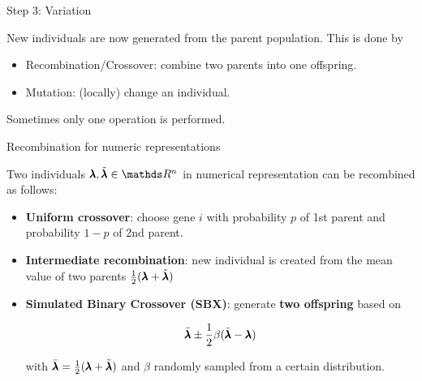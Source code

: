 \begin{frame}{Step 3: Variation}

New individuals are now generated from the parent population. This is done by

\begin{itemize}
\item Recombination/Crossover: combine two parents into one offspring.
\item Mutation: (locally) change an individual.
\end{itemize}

Sometimes only one operation is performed.

\end{frame}

\begin{frame}{Recombination for numeric representations}

Two individuals $\xx, \tilde\xx \in \R^n$ in numerical representation can be recombined as follows:

\begin{itemize}
\item \textbf{Uniform crossover}: choose gene $i$ with probability $p$ of 1st parent and probability $1-p$ of 2nd parent.
\item \textbf{Intermediate recombination}: new individual is created from the mean value of two parents $\frac{1}{2}(\pmb{\lambda} + \tilde{\pmb{\lambda}})$
\item \textbf{Simulated Binary Crossover (SBX)}: generate \textbf{two offspring} based on

$$
\bar{\pmb{\lambda}} \pm \frac{1}{2} \beta (\tilde{\pmb{\lambda}} - \pmb{\lambda})
$$

with $\bar{\pmb{\lambda}} = \frac{1}{2} (\pmb{\lambda} + \tilde{\pmb{\lambda}})$ and $\beta$ randomly sampled from a certain distribution.
\end{itemize}

\end{frame}

